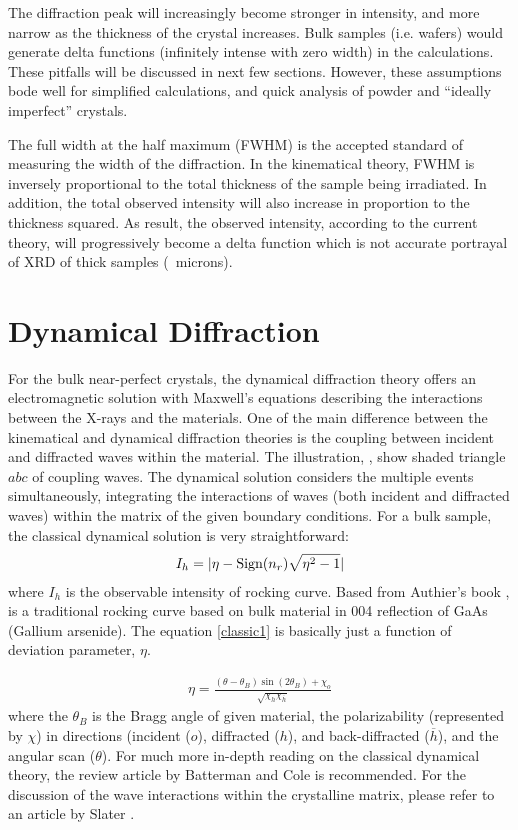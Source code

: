 The diffraction peak will increasingly become stronger in intensity, and more narrow as the thickness of the crystal increases.  Bulk samples (i.e. wafers) would generate delta functions (infinitely intense with zero width) in the calculations.  These pitfalls will be discussed in next few sections.  However, these assumptions bode well for simplified calculations, and quick analysis of powder and ``ideally imperfect'' crystals.

The full width at the half maximum (FWHM) is the accepted standard of measuring the width of the diffraction.  In the kinematical theory, FWHM is inversely proportional to the total thickness of the sample being irradiated.  In addition, the total observed intensity will also increase in proportion to the thickness squared.  As result,  the observed intensity, according to the current theory, will progressively become a delta function which is not accurate portrayal of XRD of thick samples (~microns).  


	\section{Dynamical Diffraction}

For the bulk near-perfect crystals, the dynamical diffraction theory offers an electromagnetic solution with Maxwell's equations describing the interactions between the X-rays and the materials. One of the main difference between the kinematical and dynamical diffraction theories is the coupling between incident and diffracted waves within the material.  The illustration,  , show shaded triangle $abc$ of coupling waves.  The dynamical solution considers the multiple events simultaneously, integrating the interactions of waves (both incident and diffracted waves) within the matrix of the given boundary conditions.  For a bulk sample, the classical dynamical solution is very straightforward:
\begin{align}
I_h = \lvert\eta - \text{Sign}(n_r)\sqrt{\eta^2 - 1}\rvert\label{classic1}
\end{align}
where $I_h$ is the observable intensity of rocking curve. Based from Authier's book \cite{Authier1},  is a traditional rocking curve based on bulk material in 004 reflection of GaAs (Gallium arsenide).  The equation \ref{classic1} is basically just a function of deviation parameter, $\eta$.

\begin{align}
\eta = \frac{(\theta -\theta_B) \sin (2\theta_B) + \chi_o}{\sqrt{\chi_h \chi_{\overline h}}}
\end{align}
 where the $\theta_B$ is the Bragg angle of given material, the polarizability (represented by $\chi$) in directions (incident ($o$), diffracted ($h$), and back-diffracted ($\overline h$), and the angular scan ($\theta$).  For much more in-depth reading on the classical dynamical theory, the review article  by Batterman and Cole \cite{Batterman1} is recommended. For the discussion of the wave interactions within the crystalline matrix, please refer to an article by Slater \cite{Slater1}.  


